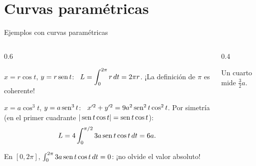 \documentclass[10pt,aspectratio=169]{beamer}
\begin{document}
\section{Curvas paramétricas}

\begin{frame}{Ejemplos con curvas paramétricas}
  \begin{columns}
    \begin{column}{0.6\textwidth}
      \begin{ejemplo}[4: circunferencia]
        $x=r\cos t$, $y=r\operatorname{sen} t$: \ $L=\displaystyle\int_0^{2\pi}r\,dt=2\pi r$. \quad ¡La definición de $\pi$ es coherente!
      \end{ejemplo}
      \begin{ejemplo}[5: astroide]
        $x=a\cos^3t$, $y=a\operatorname{sen}^3t$: \ $x'^2+y'^2=9a^2\operatorname{sen}^2t\cos^2t$.
        Por simetría (en el primer cuadrante $|\operatorname{sen} t\cos t|=\operatorname{sen} t\cos t$):
        \[ L=4\int_0^{\pi/2}3a\operatorname{sen} t\cos t\,dt=6a. \]
      \end{ejemplo}
      \begin{observacion}
        En $[0,2\pi]$, $\int_0^{2\pi}3a\operatorname{sen} t\cos t\,dt=0$: ¡no olvide el valor absoluto!
      \end{observacion}
    \end{column}
    \begin{column}{0.4\textwidth}
      \centering

      \small Un cuarto mide $\frac32a$.
    \end{column}
  \end{columns}
\end{frame}
\end{document}
